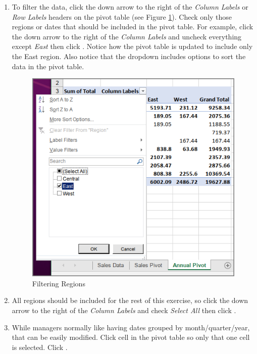 \begin{enumbox}
\begin{enumerate}
		\item To filter the data, click the down arrow to the right of the \textit{Column Labels} or \textit{Row Labels} headers on the pivot table (see Figure \ref{07:fig22}). Check only those regions or dates that should be included in the pivot table. For example, click the down arrow to the right of the \textit{Column Labels} and uncheck everything except \textit{East} then click . Notice how the pivot table is updated to include only the East region. Also notice that the dropdown includes options to sort the data in the pivot table.

		\begin{figure}[H]
			\centering
			\includegraphics[width=\maxwidth{.95\linewidth}]{gfx/ch07_fig22}
			\caption{Filtering Regions}
			\label{07:fig22}
		\end{figure}

		\item All regions should be included for the rest of this exercise, so click the down arrow to the right of the \textit{Column Labels} and check \textit{Select All} then click .
		\item While managers normally like having dates grouped by month/quarter/year, that can be easily modified. Click cell  in the pivot table so only that one cell is selected. Click .


\end{enumerate}
\end{enumbox}
